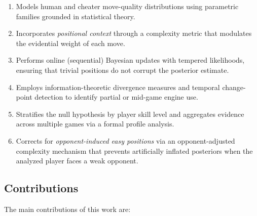 \documentclass[11pt,a4paper]{article}
\begin{document}
\begin{enumerate}[label=(\roman*)]
    \item Models human and cheater move-quality distributions using parametric
          families grounded in statistical theory.
    \item Incorporates \emph{positional context} through a complexity metric
          that modulates the evidential weight of each move.
    \item Performs online (sequential) Bayesian updates with tempered
          likelihoods, ensuring that trivial positions do not corrupt the
          posterior estimate.
    \item Employs information-theoretic divergence measures and temporal
          change-point detection to identify partial or mid-game engine use.
    \item Stratifies the null hypothesis by player skill level and aggregates
          evidence across multiple games via a formal profile analysis.
    \item Corrects for \emph{opponent-induced easy positions} via an
          opponent-adjusted complexity mechanism that prevents artificially
          inflated posteriors when the analyzed player faces a weak opponent.
\end{enumerate}

\subsection{Contributions}

The main contributions of this work are:
\end{document}
